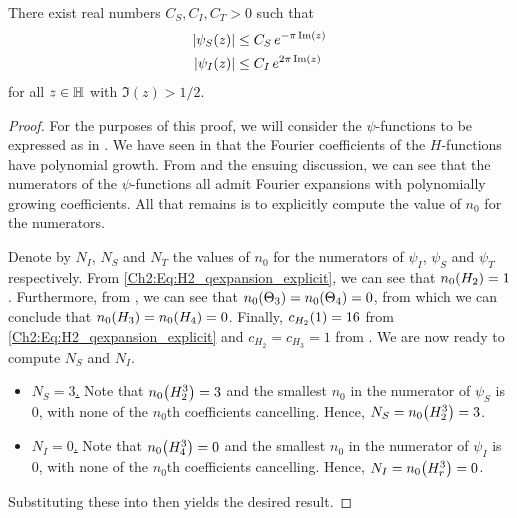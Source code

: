 \begin{boxlemma}\label{Ch4:Lemma:PolyFourierCoeffBound_Apply_b}
    There exist real numbers $C_S, C_I, C_T > 0$ such that
    \begin{align}
        \abs{\psi_S\of{z}} &\leq C_S \, e^{- \pi \Im(z)}
            \label{Ch4:Eq:PolyFourierCoeffBound_psi_S} \\
        \abs{\psi_I\of{z}} &\leq C_I \, e^{2\pi \Im(z)}
            \label{Ch4:Eq:PolyFourierCoeffBound_psi_I} %
    \end{align}
    for all $z \in \mathbb{H}$ with $\Im(z) > 1/2$.
\end{boxlemma}
\begin{proof}
    For the purposes of this proof, we will consider the $\psi$-functions to be expressed as in . We have seen in  that the Fourier coefficients of the $H$-functions have polynomial growth. From  and the ensuing discussion, we can see that the numerators of the $\psi$-functions all admit Fourier expansions with polynomially growing coefficients. All that remains is to explicitly compute the value of $n_0$ for the numerators.
    
    Denote by $N_I$, $N_S$ and $N_T$ the values of $n_0$ for the numerators of $\psi_I$, $\psi_S$ and $\psi_T$ respectively. From \eqref{Ch2:Eq:H2_qexpansion_explicit}, we can see that $n_0\!\left( H_2 \right) = 1$. Furthermore, from , we can see that $n_0\!\left( \Theta_3 \right) = n_0\!\left( \Theta_4 \right) = 0$, from which we can conclude that $n_0\!\left( H_3 \right) = n_0\!\left( H_4 \right) = 0$. Finally, $c_{H_2}\!\left( 1 \right) = 16$ from \eqref{Ch2:Eq:H2_qexpansion_explicit} and $c_{H_2} = c_{H_3} = 1$ from . We are now ready to compute $N_S$ and $N_I$.
    \begin{itemize}
        \item \underline{$N_S = 3$.} Note that $n_0\!\left( H_2^3 \right) = 3$ and the smallest $n_0$ in the numerator of $\psi_S$ is $0$, with none of the $n_0$th coefficients cancelling. Hence, $N_S = n_0\!\left( H_2^3 \right) = 3$. %

        \item \underline{$N_I = 0$.} Note that $n_0\!\left( H_4^3 \right) = 0$ and the smallest $n_0$ in the numerator of $\psi_I$ is $0$, with none of the $n_0$th coefficients cancelling. Hence, $N_I = n_0\!\left( H_r^3 \right) = 0$.
    \end{itemize}
    Substituting these into  then yields the desired result.
\end{proof}

